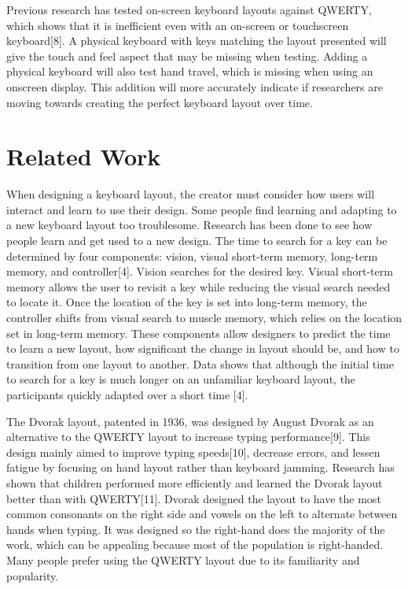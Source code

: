 \documentclass[manuscript,screen,review]{acmart}
\begin{document}
       Previous research has tested on-screen keyboard layouts against QWERTY, which shows that it is inefficient even with an on-screen or touchscreen keyboard[8]. A physical keyboard with keys matching the layout presented will give the touch and feel aspect that may be missing when testing. Adding a physical keyboard will also test hand travel, which is missing when using an onscreen display. This addition will more accurately indicate if researchers are moving towards creating the perfect keyboard layout over time.

\section{Related Work}

    When designing a keyboard layout, the creator must consider how users will interact and learn to use their design. Some people find learning and adapting to a new keyboard layout too troublesome. Research has been done to see how people learn and get used to a new design. The time to search for a key can be determined by four components: vision, visual short-term memory, long-term memory, and controller[4]. Vision searches for the desired key. Visual short-term memory allows the user to revisit a key while reducing the visual search needed to locate it. Once the location of the key is set into long-term memory, the controller shifts from visual search to muscle memory, which relies on the location set in long-term memory. These components allow designers to predict the time to learn a new layout, how significant the change in layout should be, and how to transition from one layout to another. Data shows that although the initial time to search for a key is much longer on an unfamiliar keyboard layout, the participants quickly adapted over a short time [4].

    The Dvorak layout, patented in 1936, was designed by August Dvorak as an alternative to the QWERTY layout to increase typing performance[9]. This design mainly aimed to improve typing speeds[10], decrease errors, and lessen fatigue by focusing on hand layout rather than keyboard jamming. Research has shown that children performed more efficiently and learned the Dvorak layout better than with QWERTY[11]. Dvorak designed the layout to have the most common consonants on the right side and vowels on the left to alternate between hands when typing. It was designed so the right-hand does the majority of the work, which can be appealing because most of the population is right-handed. Many people prefer using the QWERTY layout due to its familiarity and popularity. 
    
\end{document}
